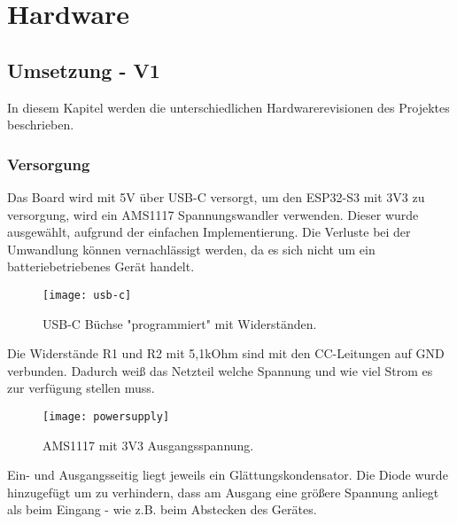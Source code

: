 \graphicspath{ {HW-PIC/} }


\chapter{Hardware}

    \section{Umsetzung - V1}
    
    In diesem Kapitel werden die unterschiedlichen Hardwarerevisionen des Projektes
    beschrieben. 

        \subsection{Versorgung}
        Das Board wird mit 5V über USB-C versorgt, um den ESP32-S3 mit 3V3 zu 
        versorgung, wird ein AMS1117 Spannungswandler verwenden. Dieser wurde ausgewählt, 
        aufgrund der einfachen Implementierung. Die Verluste bei der Umwandlung können vernachlässigt werden, da 
        es sich nicht um ein batteriebetriebenes Gerät handelt.

            \begin{figure}[h!]
                \centering
                \texttt{[image: usb-c]}
                \caption{USB-C Büchse "programmiert" mit Widerständen.}
                \label{fig:sch1}

            \end{figure}

        Die Widerstände R1 und R2 mit 5,1kOhm sind mit den CC-Leitungen auf GND verbunden.
        Dadurch weiß das Netzteil welche Spannung und wie viel Strom es zur verfügung stellen
        muss. 

            \begin{figure}[h!]
                \centering
                \texttt{[image: powersupply]}
                \caption{AMS1117 mit 3V3 Ausgangsspannung.}
                \label{fig:sch2}
                
            \end{figure}

        Ein- und Ausgangsseitig liegt jeweils ein Glättungskondensator. Die Diode wurde hinzugefügt 
        um zu verhindern, dass am Ausgang eine größere Spannung
        anliegt als beim Eingang - wie z.B. beim Abstecken des Gerätes.

        \newpage

